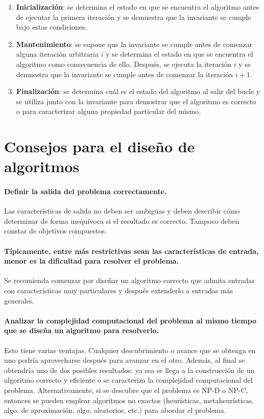 \begin{enumerate}
  \item \textbf{Inicialización}: se determina el estado en que se encuentra el algoritmo antes de ejecutar la primera iteración y se demuestra que la invariante se cumple bajo estas condiciones.
  \item \textbf{Mantenimiento}: se supone que la invariante se cumple antes de comenzar alguna iteración arbitraria \(i\) y se determina el estado en que se encuentra el algoritmo como consecuencia de ello. 
  Después, se ejecuta la iteración \(i\) y se demuestra que la invariante se cumple antes de comenzar la iteración \(i+1\).
  \item \textbf{Finalización}: se determina cuál es el estado del algoritmo al salir del bucle y se utiliza junto con la invariante para demostrar que el algoritmo es correcto o para caracterizar alguna propiedad particular del mismo. 
\end{enumerate}

\newpage
\section{Consejos para el diseño de algoritmos}

\paragraph{Definir la salida del problema correctamente.}
  Las características de salida no deben ser ambiguas y deben describir cómo determinar de forma inequívoca si el resultado es correcto.
  Tampoco deben constar de objetivos compuestos.
\paragraph{Típicamente, entre más restrictivas sean las características de entrada, menor es la dificultad para resolver el problema.} 
  Se recomienda comenzar por diseñar un algoritmo correcto que admita entradas con características muy particulares y después extenderlo a entradas más generales.
\paragraph{Analizar la complejidad computacional del problema al mismo tiempo que se diseña un algoritmo para resolverlo.} 
  Esto tiene varias ventajas.
  Cualquier descubrimiento o avance que se obtenga en uno podría aprovecharse después para avanzar en el otro.
  Además, al final se obtendría uno de dos posibles resultados: ya sea se llega a la construcción de un algoritmo correcto y eficiente o se caracteriza la complejidad computacional del problema.
  Alternativamente, si se descubre que el problema es NP-D o NP-C, entonces se pueden emplear algoritmos no exactos (heurísticas, metaheurísticas, algo. de aproximación, algo. aleatorios, etc.) para abordar el problema.
